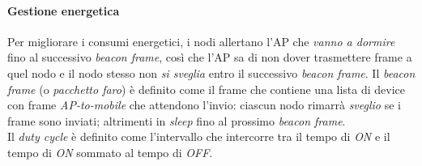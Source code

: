 \paragraph{Gestione energetica}
Per migliorare i consumi energetici, i nodi allertano l'AP che \textit{vanno a dormire} fino al successivo \textit{beacon frame}, così che l'AP sa di non dover trasmettere frame a quel nodo e il nodo stesso non \textit{si sveglia} entro il successivo \textit{beacon frame}.
Il \textit{beacon frame} (o \textit{pacchetto faro}) è definito come il frame che contiene una lista di device con frame \textit{AP-to-mobile} che attendono l'invio: ciascun nodo rimarrà \textit{sveglio} se i frame sono inviati; altrimenti in \textit{sleep} fino al prossimo \textit{beacon frame}. \\
Il \textit{duty cycle} è definito come l'intervallo che intercorre tra il tempo di \textit{ON} e il tempo di \textit{ON} sommato al tempo di \textit{OFF}.

